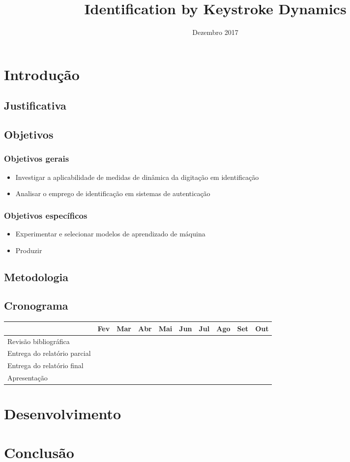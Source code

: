 \documentclass[pfc]{imetex}
\title{Identification by Keystroke Dynamics}
\date{Dezembro 2017}
\begin{document}
\chapter{Introdução}

\section{Justificativa}
\section{Objetivos}
\subsection{Objetivos gerais}
\begin{itemize}
\item Investigar a aplicabilidade de medidas de dinâmica da digitação em identificação
\item Analisar o emprego de identificação em sistemas de autenticação
\end{itemize}
\subsection{Objetivos específicos}
\begin{itemize}
\item Experimentar e selecionar modelos de aprendizado de máquina
\item Produzir
\end{itemize}
\section{Metodologia}
\section{Cronograma}

\begin{table}[htb]
\begin{tabular}{|l|c|c|c|c|c|c|c|c|c|}
\hline
& Fev & Mar & Abr & Mai & Jun & Jul & Ago & Set & Out \\
\hline
Revisão bibliográfica &
\multicolumn{1}{c}{\cellcolor[gray]{0.5}} &
\multicolumn{7}{c}{} &
\\
\hline
Entrega do relatório parcial &
\multicolumn{3}{c}{} &
\multicolumn{1}{c}{\cellcolor[gray]{0.5}} &
\multicolumn{1}{c}{} &
\multicolumn{1}{c}{\cellcolor[gray]{0.5}} &
\multicolumn{2}{c}{} &
\\
\hline
Entrega do relatório final &
\multicolumn{7}{c}{} &
\multicolumn{1}{c}{\cellcolor[gray]{0.5}} &
\\
\hline
Apresentação &
\multicolumn{8}{c}{} &
\multicolumn{1}{c}{\cellcolor[gray]{0.5}}
\\
\hline
\end{tabular}
\end{table}

\chapter{Desenvolvimento}
\chapter{Conclusão}
\end{document}
